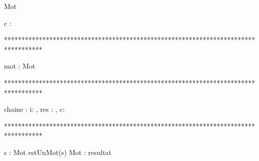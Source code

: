\begin{algorithme}
    
    \begin{enregistrement}{Mot}%
    \end{enregistrement}

      {c : \caractere}%
      {\booleen}%
      {}%
      {
      }
\end{algorithme}

***********************************************************************************
\begin{algorithme}
       {mot : Mot}%
       {\entier}%
       {}%
       {
         

        }
\end{algorithme}

***********************************************************************************
\begin{algorithme}
     {chaine : \chaine}%
     {\booleen}%
     {i: \entier, res : \booleen, c: \caractere}%
     {     

        	{
        	}%
        	{

			   {
				  {
				  }%
		           }%
                }%
        
      }
  
\end{algorithme}

***********************************************************************************
\begin{algorithme}
    {s : \chaine}%
    {Mot}%
    {estUnMot(s)}%
    {Mot : resultat}%
    {
    }
\end{algorithme}

